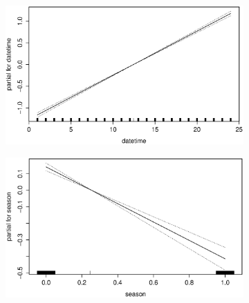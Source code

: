 \begin{figure}[H]
        \begin{subfigure}{0.4\textwidth}
          \includegraphics[width=\columnwidth]{images/non-linear/gam/gam-datetime.eps}
        \end{subfigure}
        \hspace*{\fill}
        \begin{subfigure}{0.4\textwidth}
          \includegraphics[width=\columnwidth]{images/non-linear/gam/gam-season.eps}
        \end{subfigure}


\end{figure}
